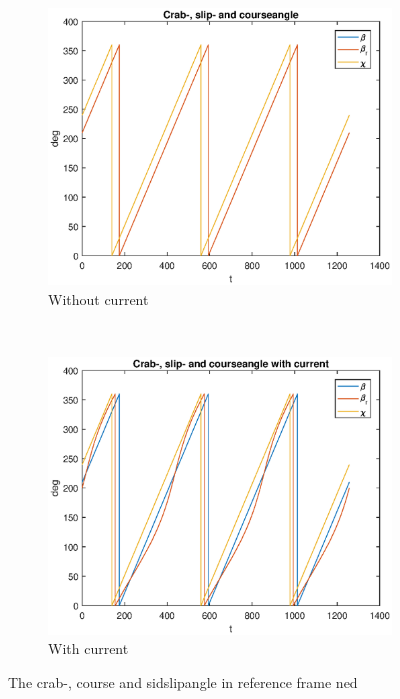\begin{figure}[!ht]
	\centering
	\begin{subfigure}[b]{0.45\textwidth}
		\includegraphics[width=\textwidth]{figures/4_crab_slip_course}
		\caption{Without current}
	\end{subfigure}
	~ %
	\begin{subfigure}[b]{0.45\textwidth}
		\includegraphics[width=\textwidth]{figures/4_crab_slip_course_current}
		\caption{With current}
	\end{subfigure}
	\label{fig:4_crab}
	\caption{The crab-, course and sidslipangle  in reference frame ned}
\end{figure}

